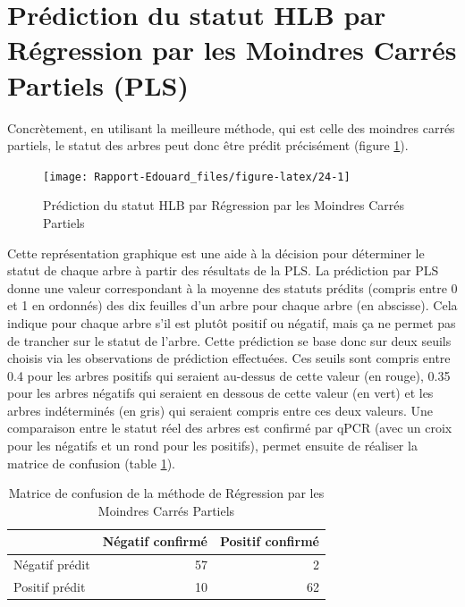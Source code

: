 \documentclass[
  11pt,
  french,
  a4paper,
  extrafontsizes,onecolumn,openright
  ]{memoir}
\begin{document}
\vfill
\newpage

\hypertarget{pruxe9diction-du-statut-hlb-par-ruxe9gression-par-les-moindres-carruxe9s-partiels-pls}{%
\section{Prédiction du statut HLB par Régression par les Moindres Carrés Partiels (PLS)}\label{pruxe9diction-du-statut-hlb-par-ruxe9gression-par-les-moindres-carruxe9s-partiels-pls}}

Concrètement, en utilisant la meilleure méthode, qui est celle des moindres carrés partiels, le statut des arbres peut donc être prédit précisément (figure \ref{fig:24}).

\scriptsize

\begin{figure}

{\centering \texttt{[image: Rapport-Edouard\_files/figure-latex/24-1]} 

}

\caption{Prédiction du statut HLB par Régression par les Moindres Carrés Partiels}\label{fig:24}
\end{figure}

\normalsize

Cette représentation graphique est une aide à la décision pour déterminer le statut de chaque arbre à partir des résultats de la PLS. La prédiction par PLS donne une valeur correspondant à la moyenne des statuts prédits (compris entre 0 et 1 en ordonnés) des dix feuilles d'un arbre pour chaque arbre (en abscisse). Cela indique pour chaque arbre s'il est plutôt positif ou négatif, mais ça ne permet pas de trancher sur le statut de l'arbre. Cette prédiction se base donc sur deux seuils choisis via les observations de prédiction effectuées. Ces seuils sont compris entre 0.4 pour les arbres positifs qui seraient au-dessus de cette valeur (en rouge), 0.35 pour les arbres négatifs qui seraient en dessous de cette valeur (en vert) et les arbres indéterminés (en gris) qui seraient compris entre ces deux valeurs. Une comparaison entre le statut réel des arbres est confirmé par qPCR (avec un croix pour les négatifs et un rond pour les positifs), permet ensuite de réaliser la matrice de confusion (table \ref{tab:T3}).

\vfill
\newpage

\scriptsize

\begin{longtable}[t]{lrr}
\caption{\label{tab:T3}Matrice de confusion de la méthode de Régression par les Moindres Carrés Partiels}\\
\toprule
  & Négatif confirmé & Positif confirmé\\
\midrule
Négatif prédit & 57 & 2\\
Positif prédit & 10 & 62\\
\bottomrule
\end{longtable}
\end{document}
